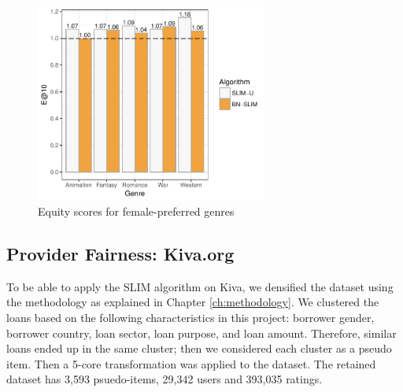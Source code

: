 \begin{figure}[bth]
    \centering
    \includegraphics[width=3in]{imgs/bln/inverse-genres3.pdf}
    \caption{Equity scores for female-preferred genres}
    \label{fig:inverse-equity}
\end{figure}

\subsection{Provider Fairness: Kiva.org}


To be able to apply the SLIM algorithm on Kiva, we densified the dataset using the methodology as explained in Chapter \ref{ch:methodology}. We clustered the loans based on the following characteristics in this project: borrower gender, borrower country, loan sector, loan purpose, and loan amount. Therefore, similar loans ended up in the same cluster; then we considered each cluster as a pseudo item. Then a 5-core transformation was applied to the dataset. The retained dataset has 3,593 psuedo-items, 29,342 users and 393,035 ratings.


